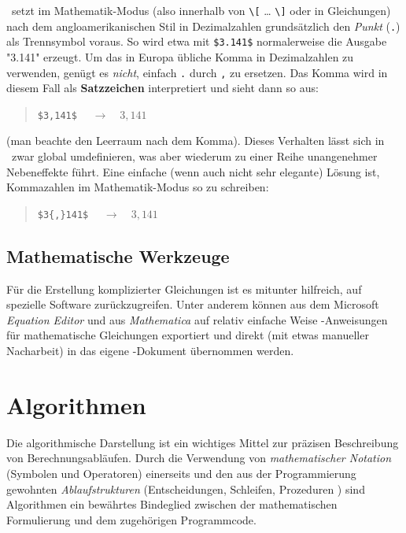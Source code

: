 \latex\ setzt im Mathematik-Modus (also innerhalb von \verb!\[! \ldots
\verb!\]! oder in Gleichungen) nach dem angloamerikanischen Stil in
Dezimalzahlen grundsätzlich den \emph{Punkt} (\verb!.!) als Trennsymbol
voraus. So wird etwa mit \verb!$3.141$! normalerweise die Ausgabe "3.141"
erzeugt. Um das in Europa übliche Komma in Dezimalzahlen zu verwenden, genügt
es \emph{nicht}, einfach \verb!.! durch \verb!,! zu ersetzen. Das Komma wird
in diesem Fall als \textbf{Satzzeichen} interpretiert und sieht dann so aus:
%
\begin{quote}
	\verb!$3,141$! $\quad \rightarrow \quad 3,141$
\end{quote}
%
(man beachte den Leerraum nach dem Komma). Dieses Verhalten lässt sich in
\latex\ zwar global umdefinieren, was aber wiederum zu einer Reihe
unangenehmer Nebeneffekte führt. Eine einfache (wenn auch nicht sehr
elegante) Lösung ist, Kommazahlen im Mathematik-Modus so zu schreiben:
%
\begin{quote}
	\verb!$3{,}141$! $\quad \rightarrow \quad 3{,}141$
\end{quote}


\subsection{Mathematische Werkzeuge}

Für die Erstellung komplizierter Gleichungen ist es mitunter hilfreich, auf
spezielle Software zurückzugreifen. Unter anderem können aus dem Microsoft
\emph{Equation Editor} und aus {\em Mathematica} auf relativ einfache Weise
\latex-An\-wei\-sun\-gen für mathematische Gleichungen exportiert und direkt
(mit etwas manueller Nacharbeit) in das eigene \latex-Dokument übernommen
werden.


\section{Algorithmen}

Die algorithmische Darstellung ist ein wichtiges Mittel zur präzisen
Beschreibung von Berechnungsabläufen. Durch die Verwendung von
\emph{mathematischer Notation} (Symbolen und Operatoren) einerseits und den
aus der Programmierung gewohnten \emph{Ablaufstrukturen} (Entscheidungen,
Schleifen, Prozeduren \etc) sind Algorithmen ein bewährtes Bindeglied
zwischen der mathematischen Formulierung und dem zugehörigen Programmcode.

